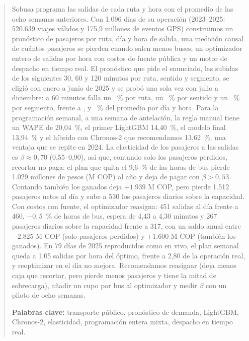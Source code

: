 \begin{abstract}
\noindent Sobusa programa las salidas de cada ruta y hora con el promedio de las ocho semanas anteriores. Con 1.096
días de su operación (2023--2025: 520.639 viajes válidos y 175,9 millones de eventos GPS) construimos un pronóstico
de pasajeros por ruta, día y hora de salida, una medición causal de cuántos pasajeros se pierden cuando salen menos
buses, un optimizador entero de salidas por hora con costos de fuente pública y un motor de despacho en tiempo real. El
pronóstico que pide el enunciado, las subidas de los siguientes 30, 60 y 120 minutos por ruta, sentido y segmento, se
eligió con enero a junio de 2025 y se probó una sola vez con julio a diciembre: a 60 minutos falla un
\CPRutaModLX~\% por ruta, un \CPSentModLX~\% por sentido y un \CPSegModLX~\% por segmento, frente a \CPRutaPromLX,
\CPSentPromLX{} y \CPSegPromLX~\% del promedio por día y hora. Para la programación semanal, a
una semana de antelación, la regla manual tiene un WAPE de 20,04~\%, el primer LightGBM 14,40~\%, el modelo final
13,94~\% y el híbrido con Chronos-2 que recomendamos 13,62~\%, una ventaja que se repite en 2024. La elasticidad de
los pasajeros a las salidas es $\beta \approx 0{,}70$ (0,55--0,90), así que, contando solo los pasajeros perdidos,
recortar no paga: el plan que quita el 9,6~\% de las horas de bus pierde 1.029 millones de pesos (M COP) al año y deja
de pagar con $\beta > 0{,}53$. Contando también los ganados deja $+1.939$ M COP, pero pierde 1.512 pasajeros netos al
día y sube a 530 los pasajeros diarios sobre la capacidad. Con
costos con fuente, el optimizador reasigna: 451 salidas al día frente a 460, $-0{,}5$~\% de horas de bus, espera de
4,43 a 4,30 minutos y 267 pasajeros diarios sobre la capacidad frente a 317, con un saldo anual entre $-2.825$ M COP
(solo pasajeros perdidos) y $+1.600$ M COP (también los ganados). En 79 días de 2025 reproducidos como en vivo, el plan
semanal queda a 1,05 salidas por hora del óptimo, frente a 2,80 de la operación real, y reoptimizar en el día no
mejora. Recomendamos reasignar (deja menos caja que recortar, pero pierde menos pasajeros y tiene la mitad de sobrecarga),
añadir un cupo por bus al optimizador y medir $\beta$ con un piloto de ocho semanas.

\medskip
\noindent\textbf{Palabras clave:} transporte público, pronóstico de demanda, LightGBM, Chronos-2,
elasticidad, programación entera mixta, despacho en tiempo real.
\end{abstract}
